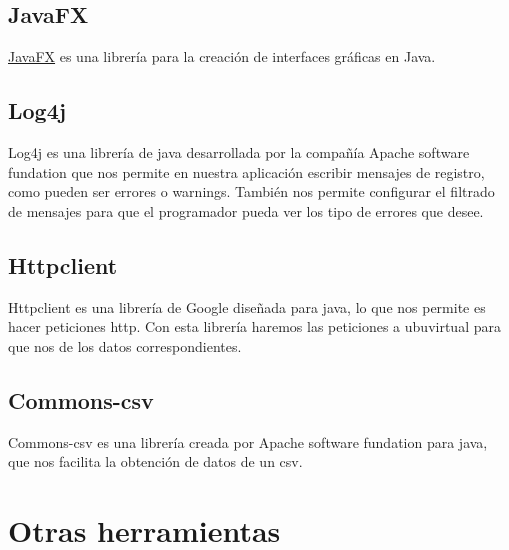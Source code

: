 \subsection{JavaFX}\label{javafx}

\href{http://docs.oracle.com/javase/8/javase-clienttechnologies.htm}{JavaFX}
es una librería para la creación de interfaces gráficas en Java.

\subsection{Log4j}\label{log4j}

Log4j es una librería de java desarrollada por la compañía Apache software fundation que nos permite en nuestra aplicación escribir mensajes de registro, como pueden ser errores o warnings. También nos permite configurar el filtrado de mensajes para que el programador pueda ver los tipo de errores que desee. \cite{Java:log}

\subsection{Httpclient}\label{httpclient}

Httpclient es una librería de Google diseñada para java, lo que nos permite es hacer peticiones http. Con esta librería haremos las peticiones a ubuvirtual para que nos de los datos correspondientes. \cite{java:Httpclient}

\subsection{Commons-csv}\label{commons-csv}

Commons-csv es una librería creada por Apache software fundation para java, que nos facilita la obtención de datos de un csv. \cite{java:csvparser}





\section{Otras herramientas}\label{otras-herramientas}

